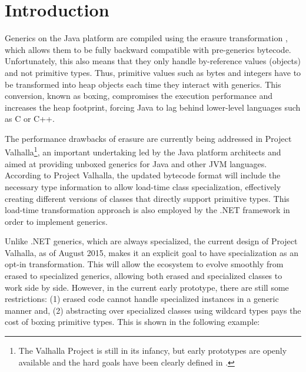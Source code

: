 \section{Introduction}
\label{sec:intro}

Generics on the Java platform are compiled using the erasure transformation \cite{java-erasure}, which allows them to be fully backward compatible with pre-generics bytecode. Unfortunately, this also means that they only handle by-reference values (objects) and not primitive types. Thus, primitive values such as bytes and integers have to be transformed into heap objects each time they interact with generics. This conversion, known as boxing, compromises the execution performance and increases the heap footprint, forcing Java to lag behind lower-level languages such as C or C++.

The performance drawbacks of erasure are currently being addressed in Project Valhalla\footnote{The Valhalla Project is still in its infancy, but early prototypes are openly available and the hard goals have been clearly defined in \cite{goetz-specialization, rose-value-classes-tearing, rose-value-classes-vm}.\vspace{-0.5em}}, an important undertaking led by the Java platform architects and aimed at providing unboxed generics for Java and other JVM languages. According to Project Valhalla, the updated bytecode format will include the necessary type information to allow load-time class specialization, effectively creating different versions of classes that directly support primitive types. This load-time transformation approach is also employed by the .NET framework \cite{dot-net-generics,dot-net-generics-form} in order to implement generics.


Unlike .NET generics, which are always specialized, the current design of Project Valhalla, as of August 2015, makes it an explicit goal to have specialization as an opt-in transformation. This will allow the ecosystem to evolve smoothly from erased to specialized generics, allowing both erased and specialized classes to work side by side. However, in the current early prototype, there are still some restrictions: (1) erased code cannot handle specialized instances in a generic manner and, (2) abstracting over specialized classes using wildcard types \cite{valhalla-model2-announcement,valhalla-model2-implementation} pays the cost of boxing primitive types. This is shown in the following example:

